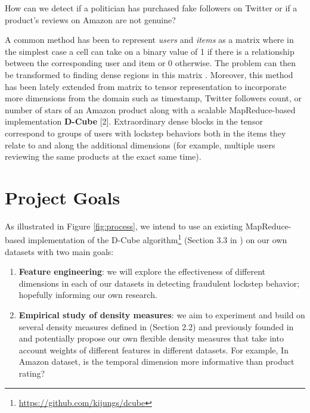 \documentclass[10pt,twocolumn]{article}
\begin{document}
How can we detect if a politician has purchased fake followers on Twitter or if a product's reviews on Amazon are not genuine?

A common method has been to represent \emph{users} and \emph{items} as a matrix where in the simplest case a cell can take on a binary value of 1 if there is a relationship between the corresponding user and item or 0 otherwise. The problem can then be transformed to finding dense regions in this matrix \cite{hooi2016fraudar}. Moreover, this method has been lately extended from matrix to tensor representation to incorporate more dimensions from the domain such as timestamp, Twitter followers count, or number of stars of an Amazon product along with a scalable MapReduce-based implementation \textbf{D-Cube} [2]. Extraordinary dense blocks in the tensor correspond to groups of users with lockstep behaviors both in the items they relate to and along the additional dimensions (for example, multiple users reviewing the same products at the exact same time). 



\section{Project Goals}

As illustrated in Figure \ref{fig:process}, we intend to use an existing MapReduce-based implementation of the D-Cube algorithm\footnote{\href{https://github.com/kijungs/dcube}{https://github.com/kijungs/dcube}} (Section 3.3 in \cite{shin2017d}) on our own datasets with two main goals:
\begin{enumerate}
	\item \textbf{Feature engineering}: we will explore the effectiveness of different dimensions in each of our datasets in detecting fraudulent lockstep behavior; hopefully informing our own research.
	\item \textbf{Empirical study of density measures}: we aim to experiment and build on several density measures defined in \cite{shin2017d} (Section 2.2) and previously founded in \cite{jiang2015general} and potentially propose our own flexible density measures that take into account weights of different features in different datasets. For example, In Amazon dataset, is the temporal dimension more informative than product rating?
\end{enumerate}
\end{document}
